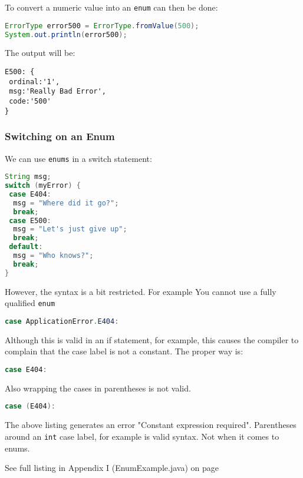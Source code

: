 To convert a numeric value into an \texttt{enum} can then be done:
\begin{lstlisting}[language=Java]
ErrorType error500 = ErrorType.fromValue(500);
System.out.println(error500);
\end{lstlisting}

The output will be:
\begin{lstlisting}
E500: {
 ordinal:'1',
 msg:'Really Bad Error',
 code:'500'
}
\end{lstlisting}

\subsubsection{Switching on an Enum}
We can use \texttt{enums} in a switch statement:
\begin{lstlisting}[language=Java]
String msg;
switch (myError) {
 case E404:
  msg = "Where did it go?";
  break;
 case E500:
  msg = "Let's just give up";
  break;
 default:
  msg = "Who knows?";
  break;
}
\end{lstlisting}
However, the syntax is a bit restricted. For example You cannot use a fully qualified \texttt{enum}
\begin{lstlisting}[language=Java]
case ApplicationError.E404:
\end{lstlisting}
Although this is valid in an if statement, for example, this causes the compiler to complain that the case label is not a constant. The proper way is:
\begin{lstlisting}[language=Java]
case E404:
\end{lstlisting}
Also wrapping the cases in parentheses is not valid.
\begin{lstlisting}[language=Java]
case (E404):
\end{lstlisting}
The above listing generates an error "Constant expression required". Parentheses around an \texttt{int} case label, for example is valid syntax. Not when it comes to enums.

See full listing in Appendix I (EnumExample.java) on page \pageref{App:AppendixIExample}